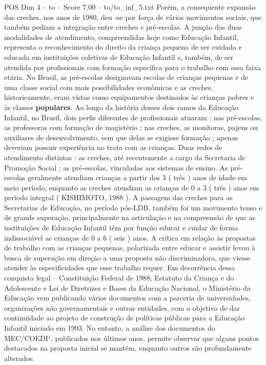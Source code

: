 \begin{textsample}{POS Dim 4 – to – Score 7.00 – to/to\_inf\_5.txt}
Porém, a consequente expansão das creches, nos anos de 1980, deu -se por força de vários movimentos sociais, que também pediam a integração entre creches e pré-escolas.
A junção das duas modalidades de atendimento, compreendidas hoje como Educação Infantil, representa o reconhecimento do direito da criança pequena de ser cuidada e educada em instituições coletivas de Educação Infantil e, também, de ser atendida por profissionais com formação específica para o trabalho com essa faixa etária.
No Brasil, as pré-escolas designavam escolas de crianças pequenas e de uma classe social com mais possibilidades econômicas e as creches, historicamente, eram vistas como equipamentos destinados às crianças pobres e às classes \textbf{populares}.
Ao longo da história desses dois ramos da Educação Infantil, no Brasil, dois perfis diferentes de profissionais atuaram : nas pré-escolas, as professoras com formação de magistério ; nas creches, as monitoras, pajens ou auxiliares de desenvolvimento, sem que delas se exigisse formação ; apenas deveriam possuir experiência no trato com as crianças.
Duas redes de atendimento distintas : as creches, até recentemente a cargo da Secretaria de Promoção Social ; as pré-escolas, vinculadas aos sistemas de ensino.
As pré-escolas geralmente atendiam crianças a partir dos 3 ( três ) anos de idade em meio período, enquanto as creches atendiam as crianças de 0 a 3 ( três ) anos em período integral ( KISHIMOTO, 1988 ).
A passagem das creches para as Secretarias de Educação, no período pós-LDB, também foi um movimento tenso e de grande superação, principalmente na articulação e na compreensão de que as instituições de Educação Infantil têm por função educar e cuidar de forma indissociável as crianças de 0 a 6 ( seis ) anos.
A crítica em relação às propostas de trabalho com as crianças pequenas, polarizada entre educar e assistir levou à busca de superação em direção a uma proposta não discriminadora, que viesse atender às especificidades que esse trabalho requer.
Em decorrência dessa conquista legal – Constituição Federal de 1988, Estatuto da Criança e do Adolescente e Lei de Diretrizes e Bases da Educação Nacional, o Ministério da Educação vem publicando vários documentos com a parceria de universidades, organizações não governamentais e outras entidades, com o objetivo de dar continuidade ao projeto de construção de políticas públicas para a Educação Infantil iniciado em 1993.
No entanto, a análise dos documentos do MEC/COEDI¹, publicados nos últimos anos, permite observar que alguns pontos destacados na proposta inicial se mantêm, enquanto outros são profundamente alterados.

\end{textsample}
